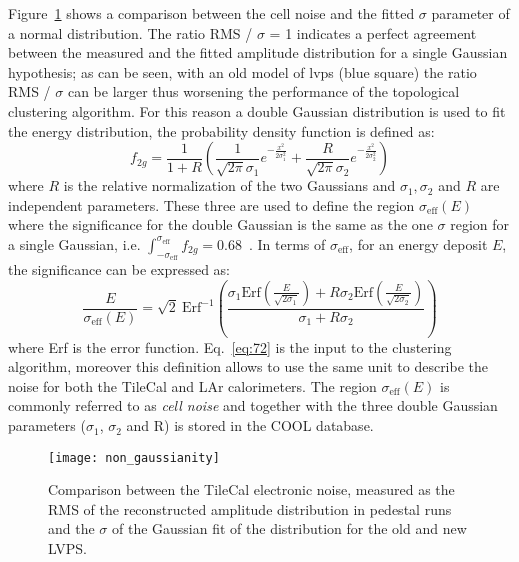 Figure~\ref{fig:non_gaussianity} shows a comparison between the cell noise and
the fitted $\sigma$ parameter of a normal distribution. The ratio RMS / $\sigma$
= 1 indicates a perfect agreement between the measured and the fitted amplitude
distribution for a single Gaussian hypothesis; as can be seen, with an old model
of \gls{lvps} (blue square) the ratio RMS / $\sigma$ can be larger thus
worsening the performance of the topological clustering algorithm. For this
reason a double Gaussian distribution is used to fit the energy distribution,
the probability density function is defined as:
\begin{equation}
  \label{eq:71}
  f_{2g} = \frac{1}{1 + R} \left( \frac{1}{\sqrt{2 \pi} \sigma_1} e^{-
      \frac{x^2}{2 \sigma_1^2}} + \frac{R}{\sqrt{2 \pi} \sigma_2} e^{-
      \frac{x^2}{2 \sigma_2^2}} \right)
\end{equation}
where $R$ is the relative normalization of the two Gaussians and
$\sigma_1, \sigma_2$ and $R$ are independent parameters. These three are used to
define the region $\sigma_{\text{eff}}(E)$ where the significance for the double
Gaussian is the same as the one $\sigma$ region for a single Gaussian,
i.e.
$\int_{- \sigma_{\text{eff}}}^{\sigma_{\text{eff}}} f_{2g} =
0.68$~\cite{TileReadiness}.
In terms of $\sigma_{\text{eff}}$, for an energy deposit $E$, the significance
can be expressed as:
\begin{equation}
  \label{eq:72}
  \frac{E}{\sigma_{\text{eff}}(E)} = \sqrt{2}\ \text{Erf}^{- 1} \left( \frac{\sigma_1
      \text{Erf} \left(\frac{E}{\sqrt{2 \sigma_1}} \right) + R \sigma_2 \text{Erf}
    \left( \frac{E}{\sqrt{2 \sigma_2}} \right)}{\sigma_1 + R \sigma_2} \right)
\end{equation}
where Erf is the error function. Eq.~\eqref{eq:72} is the input to the
clustering algorithm, moreover this definition allows to use the same unit to
describe the noise for both the TileCal and LAr calorimeters. The region
$\sigma_{\text{eff}}(E)$ is commonly referred to as \emph{cell noise} and
together with the three double Gaussian parameters ($\sigma_1$, $\sigma_2$ and
R) is stored in the COOL database.

\begin{figure}[!h]
  \centering
    \texttt{[image: non\_gaussianity]}
    \caption{Comparison between the TileCal electronic noise, measured as the
      RMS of the reconstructed amplitude distribution in pedestal runs and the
      $\sigma$ of the Gaussian fit of the distribution for the old and new LVPS.}
    \label{fig:non_gaussianity}
\end{figure}
